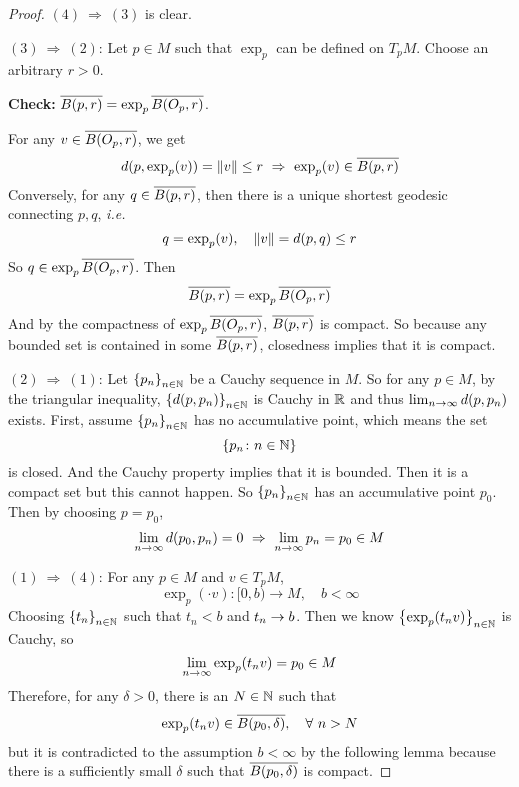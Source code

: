 \begin{proof}
	$(4) ~\Rightarrow~ (3)$ is clear.

	\noindent $(3) ~\Rightarrow~ (2)$: Let $p \in M$ such that $\exp_p$ can be defined on $T_pM$. Choose an arbitrary $r > 0$.

	\noindent \textbf{Check:} $\overline{B(p,r)} = \exp_p{\overline{B(O_p,r)}}$.

	\noindent For any $v \in \overline{B(O_p,r)}$, we get
	\begin{equation*}
		d(p,\exp_p(v)) = \left\lVert v\right\lVert \leq r~\Rightarrow~ \exp_p(v) \in \overline{B(p,r)}
	\end{equation*}
	Conversely, for any $q \in \overline{B(p,r)}$, then there is a unique shortest geodesic connecting $p,q$, \emph{i.e.}
	\begin{equation*}
		q = \exp_p(v),\quad \left\lVert v\right\lVert = d(p,q) \leq r
	\end{equation*}
	So $q \in \exp_p{\overline{B(O_p,r)}}$. Then
	\begin{equation*}
		\overline{B(p,r)} = \exp_p{\overline{B(O_p,r)}}
	\end{equation*}
	And by the compactness of $\exp_p{\overline{B(O_p,r)}}$, $\overline{B(p,r)}$ is compact. So because any bounded set is contained in some $\overline{B(p,r)}$, closedness implies that it is compact.

	\noindent $(2) ~\Rightarrow~ (1)$: Let $\left\{p_n\right\}_{n \in \mathbb{N}}$ be a Cauchy sequence in $M$. So for any $p \in M$, by the triangular inequality, $\left\{d(p,p_n)\right\}_{n \in \mathbb{N}}$ is Cauchy in $\mathbb{R}$ and thus $\lim_{n \rightarrow \infty} d(p,p_n)$ exists. First, assume $\left\{p_n\right\}_{n \in \mathbb{N}}$ has no accumulative point, which means the set
	\begin{equation*}
		\left\{p_n \colon n \in \mathbb{N}\right\}
	\end{equation*}
	is closed. And the Cauchy property implies that it is bounded. Then it is a compact set but this cannot happen. So $\left\{p_n\right\}_{n \in \mathbb{N}}$ has an accumulative point $p_0$. Then by choosing $p = p_0$,
	\begin{equation*}
		\lim_{n \rightarrow \infty} d(p_0,p_n) = 0~\Rightarrow~\lim_{n \rightarrow \infty} p_n = p_0 \in M
	\end{equation*}

	\noindent $(1) ~\Rightarrow~ (4)$:  For any $p \in M$ and $v \in T_pM$,
	\begin{equation*}
		\exp_p(\cdot v) \colon [0,b) \longrightarrow M,\quad b < \infty
	\end{equation*}
	Choosing $\left\{t_n\right\}_{n\in \mathbb{N}}$ such that $t_n < b$ and $t_n \rightarrow b$. Then we know $\left\{\exp_p(t_nv)\right\}_{n \in \mathbb{N}}$ is Cauchy, so
	\begin{equation*}
		\lim_{n \rightarrow \infty} \exp_p(t_nv) = p_0 \in M
	\end{equation*}
	Therefore, for any $\delta > 0$, there is an $N \in \mathbb{N}$ such that
	\begin{equation*}
		\exp_p(t_nv) \in \overline{B(p_0,\delta)},\quad \forall~n > N
	\end{equation*}
	but it is contradicted to the assumption $b < \infty$ by the following lemma because there is a sufficiently small $\delta$ such that $\overline{B(p_0,\delta)}$ is compact.
\end{proof}
